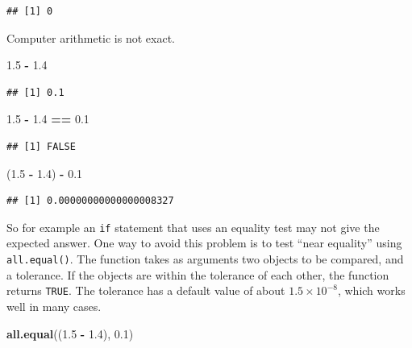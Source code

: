 \documentclass[
]{krantz}
\newenvironment{Shaded}{\begin{snugshade}}{\end{snugshade}}
\newcommand{\FloatTok}[1]{\textcolor[rgb]{0.00,0.00,0.81}{#1}}
\newcommand{\KeywordTok}[1]{\textcolor[rgb]{0.13,0.29,0.53}{\textbf{#1}}}
\newcommand{\NormalTok}[1]{#1}
\newcommand{\OperatorTok}[1]{\textcolor[rgb]{0.81,0.36,0.00}{\textbf{#1}}}
\newcommand{\StringTok}[1]{\textcolor[rgb]{0.31,0.60,0.02}{#1}}
\begin{document}
\begin{verbatim}
## [1] 0
\end{verbatim}

Computer arithmetic is not exact.

\begin{Shaded}
\begin{Highlighting}[]
\FloatTok{1.5} \OperatorTok{{-}}\StringTok{ }\FloatTok{1.4}
\end{Highlighting}
\end{Shaded}

\begin{verbatim}
## [1] 0.1
\end{verbatim}

\begin{Shaded}
\begin{Highlighting}[]
\FloatTok{1.5} \OperatorTok{{-}}\StringTok{ }\FloatTok{1.4} \OperatorTok{==}\StringTok{ }\FloatTok{0.1}
\end{Highlighting}
\end{Shaded}

\begin{verbatim}
## [1] FALSE
\end{verbatim}

\begin{Shaded}
\begin{Highlighting}[]
\NormalTok{(}\FloatTok{1.5} \OperatorTok{{-}}\StringTok{ }\FloatTok{1.4}\NormalTok{) }\OperatorTok{{-}}\StringTok{ }\FloatTok{0.1}
\end{Highlighting}
\end{Shaded}

\begin{verbatim}
## [1] 0.00000000000000008327
\end{verbatim}

So for example an \texttt{if} statement that uses an equality test may not give the expected answer. One way to avoid this problem is to test ``near equality'' using \texttt{all.equal()}. The function takes as arguments two objects to be compared, and a tolerance. If the objects are within the tolerance of each other, the function returns \texttt{TRUE}. The tolerance has a default value of about \(1.5\times 10^{-8}\), which works well in many cases.

\begin{Shaded}
\begin{Highlighting}[]
\KeywordTok{all.equal}\NormalTok{((}\FloatTok{1.5} \OperatorTok{{-}}\StringTok{ }\FloatTok{1.4}\NormalTok{), }\FloatTok{0.1}\NormalTok{)}
\end{Highlighting}
\end{Shaded}
\end{document}
